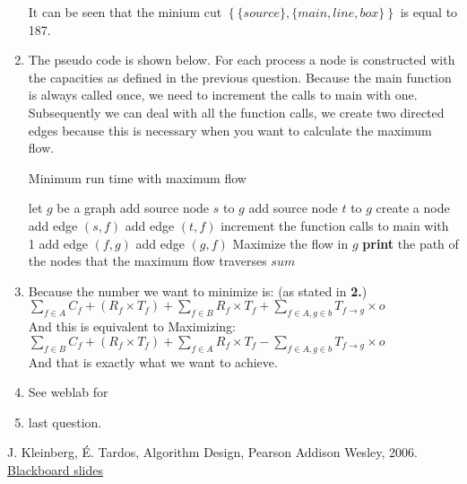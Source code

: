 \documentclass[11pt,twoside,a4paper]{article}
\begin{document}
\begin{enumerate}
\begin{figure}[!h]
\begin{tikzpicture}[->,>=stealth',shorten >=1pt,auto,node distance=5cm,
                    thick,main node/.style={circle,draw}]
\end{tikzpicture}
\end{figure}
\newline
It can be seen that the minium cut $\left\lbrace\{source\},\{main,line,box\}\right\rbrace$ is equal to 187.
\item The pseudo code is shown below. For each process a node is constructed with the capacities as defined in the previous question. Because the main function is always called once, we need to increment the calls to main with one. Subsequently we can deal with all the function calls, we create two directed edges because this is necessary when you want to calculate the maximum flow. 
		\begin{algorithm}[!h]
		\caption{Minimum run time with maximum flow }
		\label{alg:summation} 
		\begin{algorithmic}[1]
			\State let $g$ be a graph 
			\State add source node $s$ to $g$
			\State add source node $t$ to $g$
			\State
			\State create a node			
			\State add edge $(s,f)$
			\State add edge $(t,f)$
			\EndFor
			\State
			\State increment the function calls to main with 1
			\State
			\State add edge $(f,g)$
			\State add edge $(g,f)$
			\EndFor
			\State
			\State Maximize the flow in $g$
			\State
			\State \textbf{print} the path of the nodes that the maximum flow traverses
			\State \Return $sum$
		\end{algorithmic}
	\end{algorithm}

\item Because the number we want to minimize is: (as stated in \textbf{2.}) \\
$ \sum\limits_{f \in A} C_f + \left( R_f \times T_f \right)  +   \sum\limits_{f \in B} R_f \times T_f + \sum\limits_{f \in A,g \in b} T_{f \rightarrow g} \times o $ \\
And this is equivalent to Maximizing: \\
$ \sum\limits_{f \in B} C_f + \left( R_f \times T_f \right)  +   \sum\limits_{f \in A} R_f \times T_f - \sum\limits_{f \in A,g \in b} T_{f \rightarrow g} \times o $ \\
And that is exactly what we want to achieve.
\item See weblab for 
\item last question.
\end{enumerate}
\begin{thebibliography}{9}
J. Kleinberg, \' E. Tardos, 
Algorithm Design, 
Pearson Addison Wesley, 
2006.
\href{https://blackboard.tudelft.nl/webapps/portal/frameset.jsp?tab\_tab\_group\_id=\_10\_1\&url=%2Fwebapps%2Fblackboard%2Fexecute%2Flauncher%3Ftype%3DCourse%26id%3D_45924_1%26url%3D}{Blackboard slides}
\end{thebibliography}
\end{document}
